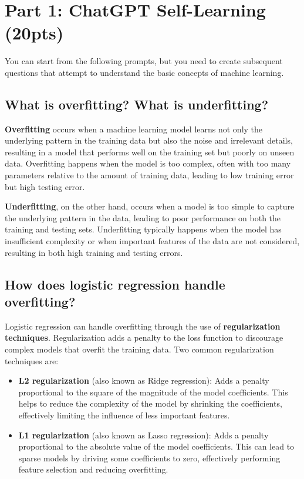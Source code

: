 \section{Part 1: ChatGPT Self-Learning (20pts)}

You can start from the following prompts, but you need to create subsequent questions that attempt to understand the basic concepts of machine learning.

\subsection{What is overfitting? What is underfitting?}

\textbf{Overfitting} occurs when a machine learning model learns not only the underlying pattern in the training data but also the noise and irrelevant details, resulting in a model that performs well on the training set but poorly on unseen data. Overfitting happens when the model is too complex, often with too many parameters relative to the amount of training data, leading to low training error but high testing error.

\textbf{Underfitting}, on the other hand, occurs when a model is too simple to capture the underlying pattern in the data, leading to poor performance on both the training and testing sets. Underfitting typically happens when the model has insufficient complexity or when important features of the data are not considered, resulting in both high training and testing errors.


\subsection{How does logistic regression handle overfitting?}

Logistic regression can handle overfitting through the use of \textbf{regularization techniques}. Regularization adds a penalty to the loss function to discourage complex models that overfit the training data. Two common regularization techniques are:

\begin{itemize}
    \item \textbf{L2 regularization} (also known as Ridge regression): Adds a penalty proportional to the square of the magnitude of the model coefficients. This helps to reduce the complexity of the model by shrinking the coefficients, effectively limiting the influence of less important features.
    \item \textbf{L1 regularization} (also known as Lasso regression): Adds a penalty proportional to the absolute value of the model coefficients. This can lead to sparse models by driving some coefficients to zero, effectively performing feature selection and reducing overfitting.
\end{itemize}

